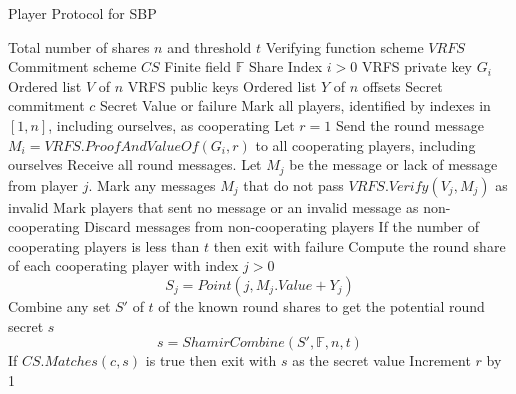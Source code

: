 \documentclass{dalcsthesis}
\begin{document}
\begin{algorithm}
  \caption{Player Protocol for SBP}
  \label{alg:SBP:Player}
  \begin{algorithmic}
    \INPUT Total number of shares $n$ and threshold $t$
    \INPUT Verifying function scheme $VRFS$
    \INPUT Commitment scheme $CS$
    \INPUT Finite field $\mathbb{F}$
    \INPUT Share Index $i > 0$
    \INPUT VRFS private key $G_i$
    \INPUT Ordered list $V$ of $n$ VRFS public keys
    \INPUT Ordered list $Y$ of $n$ offsets
    \INPUT Secret commitment $c$
    \OUTPUT Secret Value or failure
    \STATE Mark all players, identified by indexes in $[1, n]$, including ourselves, as cooperating
    \STATE Let $r = 1$
      \STATE Send the round message $M_i = VRFS.ProofAndValueOf(G_i, r)$ to all cooperating players, including ourselves
      \STATE Receive all round messages. Let $M_j$ be the message or lack of message from player $j$.
      \STATE Mark any messages $M_j$ that do not pass $VRFS.Verify(V_j, M_j)$ as invalid
      \STATE Mark players that sent no message or an invalid message as non-cooperating
      \STATE Discard messages from non-cooperating players
      \STATE If the number of cooperating players is less than $t$ then exit with failure
      \STATE Compute the round share of each cooperating player with index $j > 0$
			$$S_j = Point(j, M_j.Value + Y_j)$$
      \STATE Combine any set $S'$ of $t$ of the known round shares to get the potential round secret $s$
      		$$s = ShamirCombine(S', \mathbb{F}, n, t)$$
      \STATE If $CS.Matches(c, s)$ is true then exit with $s$ as the secret value
      \STATE Increment $r$ by 1
    \ENDWHILE
  \end{algorithmic}
\end{algorithm}
\end{document}
